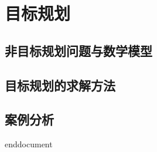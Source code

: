 \ifx\allfiles\undefined

	
	
\else
\fi
    \chapter{目标规划}
    \section{非目标规划问题与数学模型}
    \section{目标规划的求解方法}
    \section{案例分析}
    
\ifx\allfiles\undefined
	
	
	end{document}
	\else
	\fi